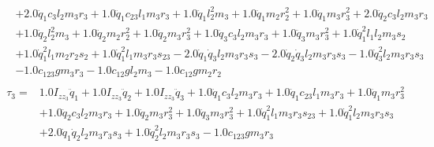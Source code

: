 \begin{align}
\begin{split}
            & + 2.0 \ddot{q}_1 c_{3} l_{2} m_{3} r_{3} + 1.0 \ddot{q}_1 c_{23} l_{1} m_{3} r_{3} + 1.0 \ddot{q}_1 l_{2}^{2} m_{3} + 1.0 \ddot{q}_1 m_{2} r_{2}^{2} + 1.0 \ddot{q}_1 m_{3} r_{3}^{2} + 2.0 \ddot{q}_2 c_{3} l_{2} m_{3} r_{3} \\
            & + 1.0 \ddot{q}_2 l_{2}^{2} m_{3} + 1.0 \ddot{q}_2 m_{2} r_{2}^{2} + 1.0 \ddot{q}_2 m_{3} r_{3}^{2} + 1.0 \ddot{q}_3 c_{3} l_{2} m_{3} r_{3} + 1.0 \ddot{q}_3 m_{3} r_{3}^{2} + 1.0 \dot{q}_1^{2} l_{1} l_{2} m_{3} s_{2} \\
            & + 1.0 \dot{q}_1^{2} l_{1} m_{2} r_{2} s_{2} + 1.0 \dot{q}_1^{2} l_{1} m_{3} r_{3} s_{23} - 2.0 \dot{q}_1 \dot{q}_3 l_{2} m_{3} r_{3} s_{3} - 2.0 \dot{q}_2 \dot{q}_3 l_{2} m_{3} r_{3} s_{3} - 1.0 \dot{q}_3^{2} l_{2} m_{3} r_{3} s_{3} \\
            & - 1.0 c_{123} g m_{3} r_{3} - 1.0 c_{12} g l_{2} m_{3} - 1.0 c_{12} g m_{2} r_{2}
    \end{split}
    \label{eq:3r-dyn-tau-vect-elem2}
    \\
    \begin{split}
        \tau_3 =& 1.0 I_{zz_3} \ddot{q}_1 + 1.0 I_{zz_3} \ddot{q}_2 + 1.0 I_{zz_3} \ddot{q}_3 + 1.0 \ddot{q}_1 c_{3} l_{2} m_{3} r_{3} + 1.0 \ddot{q}_1 c_{23} l_{1} m_{3} r_{3} + 1.0 \ddot{q}_1 m_{3} r_{3}^{2} \\
            & + 1.0 \ddot{q}_2 c_{3} l_{2} m_{3} r_{3} + 1.0 \ddot{q}_2 m_{3} r_{3}^{2} + 1.0 \ddot{q}_3 m_{3} r_{3}^{2} + 1.0 \dot{q}_1^{2} l_{1} m_{3} r_{3} s_{23} + 1.0 \dot{q}_1^{2} l_{2} m_{3} r_{3} s_{3} \\
            & + 2.0 \dot{q}_1 \dot{q}_2 l_{2} m_{3} r_{3} s_{3} + 1.0 \dot{q}_2^{2} l_{2} m_{3} r_{3} s_{3} - 1.0 c_{123} g m_{3} r_{3}
    \end{split}
    \label{eq:3r-dyn-tau-vect-elem3}
\end{align}

